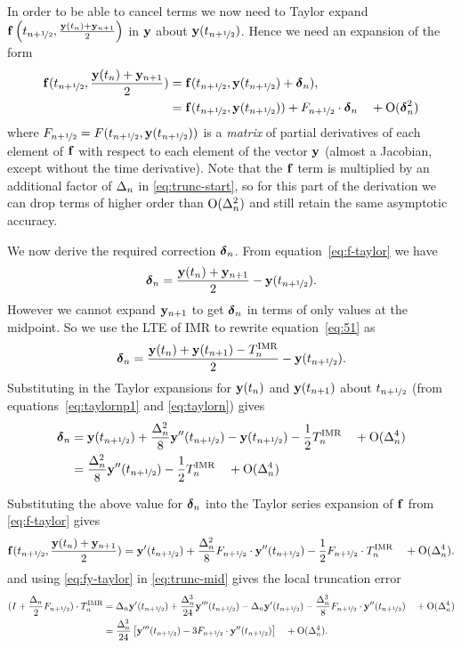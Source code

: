 In order to be able to cancel terms we now need to Taylor expand $\fv\left( \thf, \frac{\yv(t_n) + \yv_{n+1}}{2} \right)$ in $\yv$ about $\yvhf$.
Hence we need an expansion of the form
\begin{align}
  \fv(\thf, \frac{\yv(t_n) + \yv_{n+1}}{2}) &= \fv(\thf, \yvhf + \dyn),
                                              \notag \\
                                            &= \fv(\thf, \yvhf) + \dfdyhf \cdot \dyn  \porder{\dyn^2}
                                              \label{eq:f-taylor}
\end{align}
where $\dfdyhf = \dfdy(\thf, \yvhf)$ is a \emph{matrix} of partial derivatives of each element of $\fv$ with respect to each element of the vector $\yv$ (\ie almost a Jacobian, except without the time derivative).
Note that the $\fv$ term is multiplied by an additional factor of $\dtn$ in \eqref{eq:trunc-start}, so for this part of the derivation we can drop terms of higher order than $\order{\dtn^2}$ and still retain the same asymptotic accuracy.

We now derive the required correction $\dyn$.
From equation~\eqref{eq:f-taylor} we have
\begin{equation}
  \dyn = \frac{\yv(t_n) + \yv_{n+1}}{2} - \yvhf.
  \label{eq:51}
\end{equation}
However we cannot expand $\yv_{n+1}$ to get $\dyn$ in terms of only values at the midpoint.
So we use the LTE of IMR to rewrite equation~\eqref{eq:51} as
\begin{equation}
  \dyn = \frac{\yv(t_n) + \yv(t_{n+1}) - \lte^\imr}{2} - \yvhf.
\end{equation}
Substituting in the Taylor expansions for $\yv(t_n)$ and $\yv(t_{n+1})$ about $\thf$ (from equations~\eqref{eq:taylornp1} and \eqref{eq:taylorn}) gives
\begin{align}
  \dyn &= \yvhf + \frac{\dtn^2}{8} \yvhf[''] - \yvhf - \frac{1}{2} \lte^\imr \porder{\dtn^4} \notag\\
       &= \frac{\dtn^2}{8} \yvhf[''] - \frac{1}{2} \lte^\imr \porder{\dtn^4}
         \label{eq:dy-value}
\end{align}



Substituting the above value for $\dyn$ into the Taylor series expansion of $\fv$ from \eqref{eq:f-taylor} gives
\begin{equation}
  \fv(\thf, \frac{\yv(t_n) + \yv_{n+1}}{2}) = \yvhf[']
  + \frac{\dtn^2}{8} \dfdyhf \cdot \yvhf[''] - \frac{1}{2} \dfdyhf \cdot \lte^\imr \porder{\dtn^4}
  . \label{eq:fy-taylor}
\end{equation}
and using \eqref{eq:fy-taylor} in \eqref{eq:trunc-mid} gives the local truncation error
\begin{align}
  (I + \frac{\dtn}{2}\dfdyhf) \cdot\lte^\imr
  &= \dtn \yvhf['] + \frac{\dtn^3}{24} \yvhf[''']
    - \dtn \yvhf[']
    - \frac{\dtn^3}{8} \dfdyhf \cdot \yvhf[''] \porder{\dtn^4}
    \notag \\
  &= \frac{\dtn^3}{24} \left[\yvhf['''] - 3 \dfdyhf \cdot \yvhf[''] \right]
    \porder{\dtn^4}.
    \label{eq:trunc-implicit-form}
\end{align}

